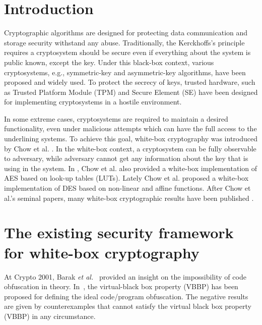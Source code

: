 \documentclass{SCIS2018}
\begin{document}

\maketitle


\section{Introduction}
Cryptographic algorithms are designed for protecting data communication and storage security withstand any abuse. Traditionally, the Kerckhoffs's principle requires a cryptosystem should be secure even if everything about the system is public known, except the key. Under this black-box context, various cryptosystems, e.g., symmetric-key and asymmetric-key algorithms, have been proposed and widely used. To protect the secrecy of keys, trusted hardware, such as Trusted Platform Module (TPM) and Secure Element (SE) have been designed for implementing cryptosystems in a hostile environment.

In some extreme cases, cryptosystems are required to maintain a desired functionality, even under malicious attempts which can have the full access to the underlining systems. To achieve this goal, white-box cryptography was introduced by Chow et al. \cite{DBLP:conf/sacrypt/ChowEJO02}. In the white-box context, a cryptosystem can be fully observable to adversary, while adversary cannot get any information about the key that is using in the system. In \cite{DBLP:conf/sacrypt/ChowEJO02}, Chow et al. also provided a white-box implementation of AES based on look-up tables (LUTs). Lately Chow et al. \cite{DBLP:conf/ccs/ChowEJO02} proposed a white-box implementation of DES based on non-linear and affine functions. After Chow et al.'s seminal papers, many white-box cryptographic results have been published \cite{DBLP:conf/sacrypt/ChowEJO02,cryptoeprint:2006:468,XiaoLai09,DBLP:conf/asiacrypt/BiryukovBK14}.

\section{The existing security framework for white-box cryptography}
At Crypto 2001, Barak \textit{et al.}~\cite{DBLP:conf/crypto/BarakGIRSVY01,DBLP:journals/jacm/BarakGIRSVY12} provided an insight on the impossibility of code obfuscation in theory. In~\cite{DBLP:conf/crypto/BarakGIRSVY01}, the virtual-black box property (VBBP) has been proposed for defining the ideal code/program obfuscation. The negative results are given by counterexamples that cannot satisfy the virtual black box property (VBBP) in any circumstance.
\end{document}
